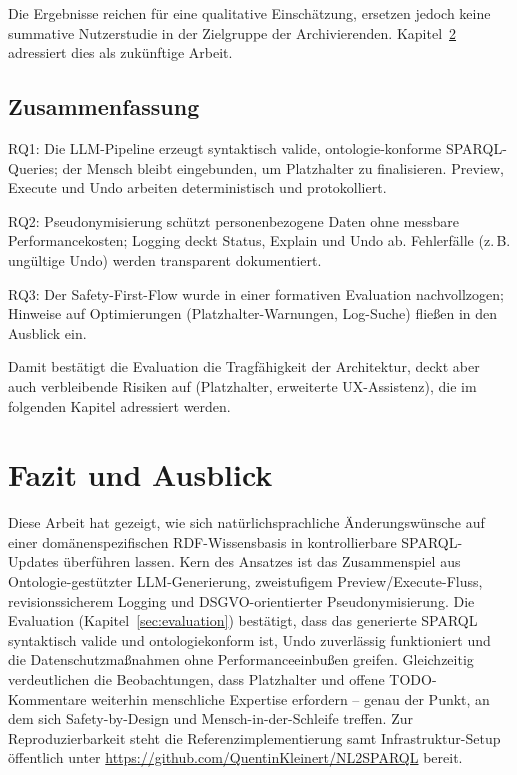 Die Ergebnisse reichen für eine qualitative Einschätzung, ersetzen jedoch keine summative Nutzerstudie in der Zielgruppe der Archivierenden. Kapitel~\ref{sec:fazit} adressiert dies als zukünftige Arbeit.

\section{Zusammenfassung}

RQ1: Die LLM-Pipeline erzeugt syntaktisch valide, ontologie-konforme SPARQL-Queries; der Mensch bleibt eingebunden, um Platzhalter zu finalisieren. Preview, Execute und Undo arbeiten deterministisch und protokolliert.

RQ2: Pseudonymisierung schützt personenbezogene Daten ohne messbare Performancekosten; Logging deckt Status, Explain und Undo ab. Fehlerfälle (z.\,B. ungültige Undo) werden transparent dokumentiert.

RQ3: Der Safety-First-Flow wurde in einer formativen Evaluation nachvollzogen; Hinweise auf Optimierungen (Platzhalter-Warnungen, Log-Suche) fließen in den Ausblick ein.

Damit bestätigt die Evaluation die Tragfähigkeit der Architektur, deckt aber auch verbleibende Risiken auf (Platzhalter, erweiterte UX-Assistenz), die im folgenden Kapitel adressiert werden.




\chapter{Fazit und Ausblick}
\label{sec:fazit}

Diese Arbeit hat gezeigt, wie sich natürlichsprachliche Änderungswünsche auf einer domänenspezifischen RDF-Wissensbasis in kontrollierbare SPARQL-Updates überführen lassen. Kern des Ansatzes ist das Zusammenspiel aus Ontologie-gestützter LLM-Generierung, zweistufigem Preview/Execute-Fluss, revisionssicherem Logging und DSGVO-orientierter Pseudonymisierung. Die Evaluation (Kapitel~\ref{sec:evaluation}) bestätigt, dass das generierte SPARQL syntaktisch valide und ontologiekonform ist, Undo zuverlässig funktioniert und die Datenschutzmaßnahmen ohne Performanceeinbußen greifen. Gleichzeitig verdeutlichen die Beobachtungen, dass Platzhalter und offene TODO-Kommentare weiterhin menschliche Expertise erfordern – genau der Punkt, an dem sich Safety-by-Design und Mensch-in-der-Schleife treffen.
Zur Reproduzierbarkeit steht die Referenzimplementierung samt Infrastruktur-Setup öffentlich unter \url{https://github.com/QuentinKleinert/NL2SPARQL} bereit.

